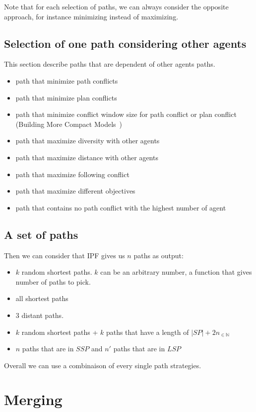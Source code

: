 \documentclass{article}
\theoremstyle{definition}
\begin{document}
Note that for each selection of paths, we can always consider the opposite approach, for instance minimizing instead of maximizing.


\subsection{Selection of one path considering other agents}
This section describe paths that are dependent of other agents paths.
\begin{itemize}
  \item path that minimize path conflicts
  \item path that minimize plan conflicts
  \item path that minimize conflict window size for path conflict or plan conflict (Building More Compact Models~\cite{yulav16a})
  \item path that maximize diversity with other agents
  \item path that maximize distance with other agents
  \item path that maximize following conflict 
  \item path that maximize different objectives\cite{rerhhch17a}
  \item path that contains no path conflict with the highest number of agent
\end{itemize}


\subsection{A set of paths}
Then we can consider that IPF gives us $n$ paths as output:
\begin{itemize}
  \item $k$ random shortest paths. $k$ can be an arbitrary number, a function that gives number of paths to pick\cite{ji22a,brse22a}.
  \item all shortest paths
  \item 3 distant paths\cite{ji22a}.
  \item $k$ random shortest paths + $k$ paths that have a length of $|SP|+2n_{\in \mathbb{N}}$
  \item $n$ paths that are in $SSP$ and $n'$ paths that are in $LSP$
\end{itemize}

Overall we can use a combinaison of every single path strategies.

\section{Merging}
\end{document}
